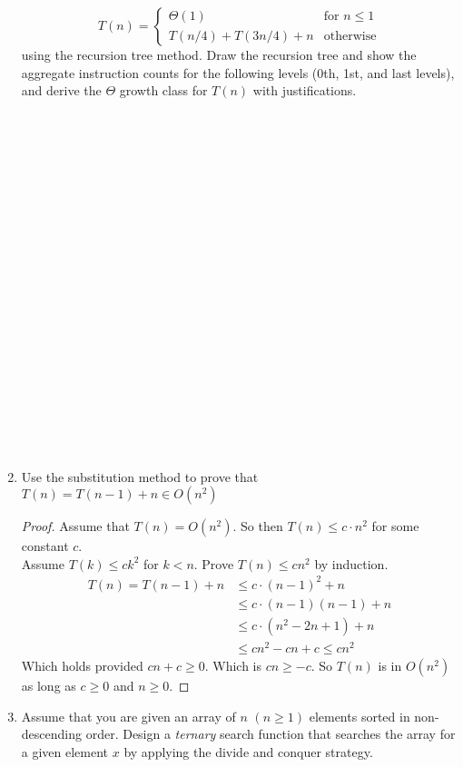 \documentclass{article}
\begin{document}
\begin{enumerate}
            \[
                T(n) = 
                \begin{cases}
                    \Theta(1) & \text{for $n\leq 1$}\\
                    T(n/4)+T(3n/4)+n & \text{otherwise}
                \end{cases}
            \]
            using the recursion tree method. Draw the recursion tree and show the aggregate instruction counts for the following levels (0th, 1st, and last levels), and derive the $\Theta$ growth class for $T(n)$ with justifications.
            \\\\\\\\\\\\\\\\\\\\\\\\\\\\\\\\\\\\\\\\\
        \item Use the substitution method to prove that $T(n)=T(n-1)+n\in O(n^2)$
            \begin{proof}
                Assume that $T(n)=O(n^2)$. So then $T(n)\leq c\cdot n^2$ for some constant $c$.\\
                Assume $T(k)\leq ck^2$ for $k<n$. Prove $T(n)\leq cn^2$ by induction.
                \begin{align*}
                    T(n) = T(n-1)+n &\leq c\cdot(n-1)^2+n\\
                         &\leq c\cdot(n-1)(n-1)+n\\
                         &\leq c\cdot (n^2-2n+1) + n\\
                         &\leq cn^2-cn+c\leq cn^2
                \end{align*}
                Which holds provided $cn+c\geq 0$. Which is $cn\geq -c$. So $T(n)$ is in $O(n^2)$ as long as $c\geq 0$ and $n\geq 0$.
            \end{proof}
        \item Assume that you are given an array of $n$ $(n\geq 1)$ elements sorted in non-descending order. Design a \textit{ternary} search function that searches the array for a given element $x$ by applying the divide and conquer strategy.

\end{enumerate}
\end{document}
